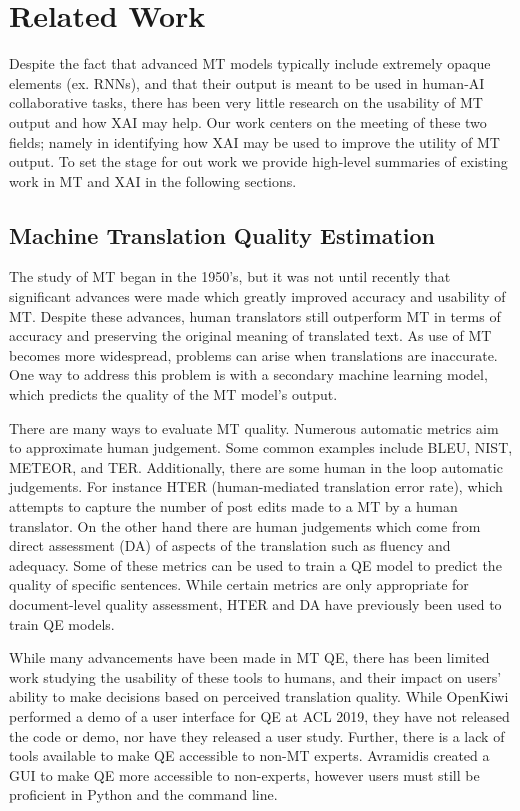\section{Related Work}

Despite the fact that advanced MT models typically include extremely opaque elements (ex. RNNs), and that their output is meant to be used in human-AI collaborative tasks\cite{mauvcec2019machine}, there has been very little research on the usability of MT output and how XAI may help. Our work centers on the meeting of these two fields; namely in identifying how XAI may be used to improve the utility of MT output. To set the stage for out work we provide high-level summaries of existing work in MT and XAI in the following sections.  

\subsection{Machine Translation Quality Estimation} 

The study of MT began in the 1950's, but it was not until recently that significant advances were made which greatly improved accuracy and usability of MT. Despite these advances, human translators still outperform MT in terms of accuracy and preserving the original meaning of translated text\cite{mauvcec2019machine}. As use of MT becomes more widespread, problems can arise when translations are inaccurate. One way to address this problem is with a secondary machine learning model, which predicts the quality of the MT model's output.  

There are many ways to evaluate MT quality. Numerous automatic metrics aim to approximate human judgement. Some common examples include BLEU, NIST, METEOR, and TER. Additionally, there are some human in the loop automatic judgements. For instance HTER (human-mediated translation error rate), which attempts to capture the number of post edits made to a MT by a human translator\cite{mauvcec2019machine}. On the other hand there are human judgements which come from direct assessment (DA) of aspects of the translation such as fluency and adequacy\cite{snover2009Fluency}. Some of these metrics can be used to train a QE model to predict the quality of specific sentences. While certain metrics are only appropriate for document-level quality assessment, HTER and DA have previously been used to train QE models.            

While many advancements have been made in MT QE, there has been limited work studying the usability of these tools to humans, and their impact on users' ability to make decisions based on perceived translation quality. While OpenKiwi \cite{UnBabel} performed a demo of a user interface for QE at ACL 2019, they have not released the code or demo, nor have they released a user study. Further, there is a lack of tools available to make QE accessible to non-MT experts. Avramidis created a GUI to make QE more accessible to non-experts, however users must still be proficient in Python and the command line\cite{avramidis2017QE}.    

